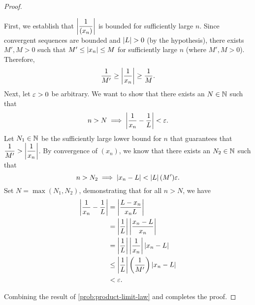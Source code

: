 \begin{problem}
\begin{enumerate}[label=(\alph*)]
\begin{proof}
          \begin{subproof}
            First, we establish that $\left\lvert \dfrac{1}{(x_{n})} \right\rvert$ is bounded for
            sufficiently large $n$. Since convergent\footnotemark{} sequences are
            bounded and $\left\lvert L \right\rvert > 0$ (by the hypothesis), there exists $M', M > 0$ 
            such that $M' \leq \left\lvert x_{n} \right\rvert \leq M$ for sufficiently large $n$ (where $M', M > 0$). 
            Therefore, 
            \[
              \dfrac{1}{M'} \geq \left\lvert \dfrac{1}{x_{n}} \right\rvert \geq \dfrac{1}{M}.
            \]
            Next, let $\varepsilon > 0$ be arbitrary. We want to show that there exists
            an $N \in \mathbb{N}$ such that
            \begin{align*}
              n > N \implies \left\lvert \frac{1}{x_{n}} - \frac{1}{L} \right\rvert < \varepsilon.
            \end{align*}
            Let $N_{1} \in \mathbb{N}$ be the sufficiently large lower bound for $n$ that guarantees that
            $\dfrac{1}{M'} > \left\lvert \dfrac{1}{x_{n}} \right\rvert$. By convergence of
            $(x_{n})$, we know that there exists an $N_{2} \in \mathbb{N}$ such that
            \[
              n > N_{2} \implies \left\lvert x_{n} - L \right\rvert < \left\lvert L \right\rvert (M') \varepsilon.
            \]
            Set $N = \max(N_{1}, N_{2})$, demonstrating that for all $n > N$, we have
            \begin{align*}
              \left\lvert \dfrac{1}{x_{n}} - \dfrac{1}{L} \right\rvert &= \left\lvert \dfrac{L - x_{n}}{x_{n}L} \right\rvert \\
                                                    &= \left\lvert \dfrac{1}{L} \right\rvert \left\lvert \dfrac{x_{n} - L}{x_{n}} \right\rvert \\
                                                    &= \left\lvert \dfrac{1}{L} \right\rvert \left\lvert \dfrac{1}{x_{n}} \right\rvert \left\lvert x_{n} - L \right\rvert \\
                                                    &\leq \left\lvert \dfrac{1}{L} \right\rvert \left( \dfrac{1}{M'} \right) \left\lvert x_{n} - L \right\rvert \\
                                                    &< \varepsilon.
            \end{align*}
          \end{subproof}

          Combining the result of \ref{prob:product-limit-law} and
           completes the proof.
        \end{proof}

    \end{enumerate}
\end{problem}

